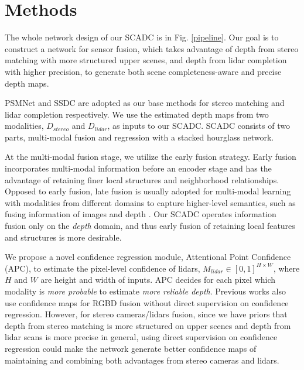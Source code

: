 \documentclass{article}
\begin{document}
\section{Methods}
\label{sec:methods}

The whole network design of our SCADC is in Fig. \ref{pipeline}. Our goal is to construct a network for sensor fusion, which takes advantage of depth from stereo matching with more structured upper scenes, and depth from lidar completion with higher precision, to generate both scene completeness-aware and precise depth maps.

PSMNet \cite{chang2018pyramid} and SSDC \cite{ma2019self} are adopted as our base methods for stereo matching and lidar completion respectively. We use the estimated depth maps from two modalities, $D_{stereo}$ and $D_{lidar}$, as inputs to our SCADC. SCADC consists of two parts, multi-modal fusion and regression with a stacked hourglass network.

At the multi-modal fusion stage, we utilize the early fusion strategy. Early fusion incorporates multi-modal information before an encoder stage and has the advantage of retaining finer local structures and neighborhood relationships. Opposed to early fusion, late fusion is usually adopted for multi-modal learning with modalities from different domains to capture higher-level semantics, such as fusing information of images and depth \cite{zhong2019deep, Jaritz_2018}. Our SCADC operates information fusion only on the \textit{depth} domain, and thus early fusion of retaining local features and structures is more desirable.

We propose a novel confidence regression module, Attentional Point Confidence (APC), to estimate the pixel-level confidence of lidars, $M_{lidar}\in [0,1]^{H\times W}$, where $H$ and $W$ are height and width of inputs. APC decides for each pixel which modality is \textit{more probable} to estimate \textit{more reliable depth}. Previous works \cite{qiu2018deeplidar, van2019sparse} also use confidence maps for RGBD fusion without direct supervision on confidence regression. However, for stereo cameras/lidars fusion, since we have priors that depth from stereo matching is more structured on upper scenes and depth from lidar scans is more precise in general, using direct supervision on confidence regression could make the network generate better confidence maps of maintaining and combining both advantages from stereo cameras and lidars.
\end{document}
